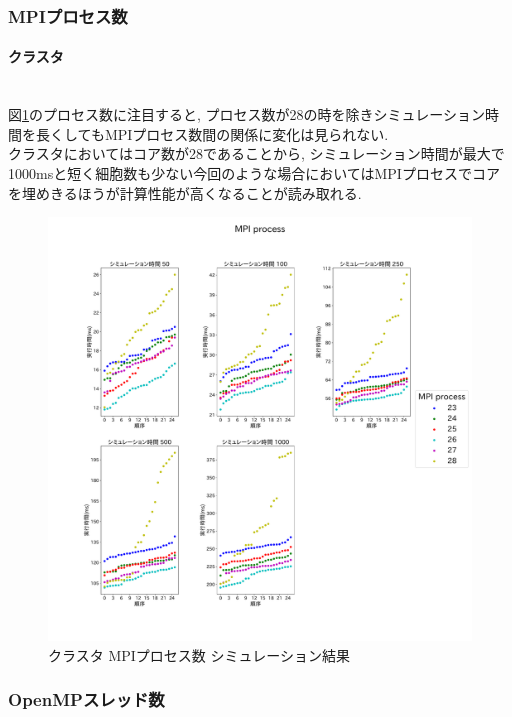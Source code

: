 \subsubsection{MPIプロセス数}
\paragraph{クラスタ}~\\
図\ref{fig:cluster-mpi-process}のプロセス数に注目すると, プロセス数が28の時を除きシミュレーション時間を長くしてもMPIプロセス数間の関係に変化は見られない.\\
クラスタにおいてはコア数が28であることから,
シミュレーション時間が最大で1000msと短く細胞数も少ない今回のような場合においてはMPIプロセスでコアを埋めきるほうが計算性能が高くなることが読み取れる.\\
\begin{figure}[htb]
\begin{center}
    \includegraphics[width=12cm]{./images/cluster-MPI-process.pdf}
    \caption{クラスタ MPIプロセス数 シミュレーション結果}
    \label{fig:cluster-mpi-process}
\end{center}
\end{figure}
\clearpage

\subsubsection{OpenMPスレッド数}
